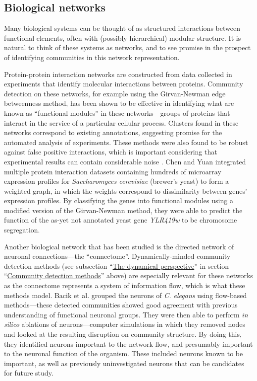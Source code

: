 \hypertarget{biological-networks}{\subsection{Biological
networks}\label{biological-networks}}

Many biological systems can be thought of as structured interactions
between functional elements, often with (possibly hierarchical) modular
structure. It is natural to think of these systems as networks, and to
see promise in the prospect of identifying communities in this network
representation.

Protein-protein interaction networks are constructed from data collected
in experiments that identify molecular interactions between proteins.
Community detection on these networks, for example using the
Girvan-Newman edge betweenness method, has been shown to be effective in
identifying what are known as ``functional modules'' in these
networks---groups of proteins that interact in the service of a
particular cellular process. Clusters found in these networks correspond
to existing annotations, suggesting promise for the automated analysis
of experiments. These methods were also found to be robust against false
positive interactions, which is important considering that experimental
results can contain considerable noise \autocite{dunn_use_2005}. Chen
and Yuan \autocite{chen_detecting_2006} integrated multiple protein
interaction datasets containing hundreds of microarray expression
profiles for \emph{Saccharomyces cerevisiae} (brewer's yeast) to form a
weighted graph, in which the weights correspond to dissimilarity between
genes' expression profiles. By classifying the genes into functional
modules using a modified version of the Girvan-Newman method, they were
able to predict the function of the as-yet not annotated yeast gene
\emph{YLR419w} to be chromosome segregation.

Another biological network that has been studied is the directed network
of neuronal connections---the ``connectome''. Dynamically-minded
community detection methods (see subsection
``\protect\hyperlink{the-dynamical-perspective}{The dynamical
perspective}'' in section
``\protect\hyperlink{communitydetectionmethods}{Community detection
methods}'' above) are especially relevant for these networks as the
connectome represents a system of information flow, which is what these
methods model. Bacik et al. \autocite{bacik_flow-based_2016} grouped the
neurons of \emph{C. elegans} using flow-based methods---these detected
communities showed good agreement with previous understanding of
functional neuronal groups. They were then able to perform \emph{in
silico} ablations of neurons---computer simulations in which they
removed nodes and looked at the resulting disruption on community
structure. By doing this, they identified neurons important to the
network flow, and presumably important to the neuronal function of the
organism. These included neurons known to be important, as well as
previously uninvestigated neurons that can be candidates for future
study.

